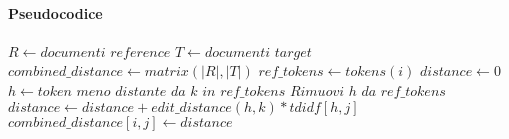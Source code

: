 \documentclass[a4paper,12pt,openany,oneside]{article}
\begin{document}
\pagebreak
\paragraph{Pseudocodice}
\begin{algorithmic}
	\State $R\gets \textit{documenti reference}$
	\State $T\gets \textit{documenti target}$
	\State $combined\_distance\gets matrix(|R|,|T|)$
			\State $ref\_tokens\gets tokens(i)$
			\State $distance\gets 0$
				\State $h\gets\textit{token meno distante da  } k \textit{  in  } ref\_tokens$
				\State $\textit{Rimuovi  } h \textit{  da  } ref\_tokens$
				\State $distance\gets distance + edit\_distance(h, k) * tdidf[h, j]$
			\EndFor
			\State $combined\_distance[i, j]\gets distance$
		\EndFor
	\EndFor
\end{algorithmic}
\end{document}
